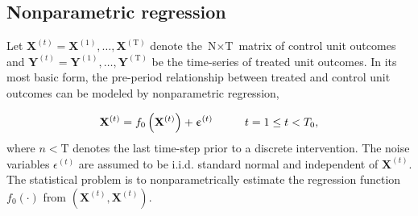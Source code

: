 \documentclass[hidelinks,12pt]{article}
\begin{document}





\subsection{Nonparametric regression}

Let $\mathbf{X}^{(t)}= \mathbf{X}^{(1)}, \ldots, \mathbf{X}^{(\text{T})}$ denote the $\text{N} \times \text{T}$ matrix of control unit outcomes and  $\mathbf{Y}^{(t)}= \mathbf{Y}^{(1)}, \ldots, \mathbf{Y}^{(\text{T})}$ be the time-series of treated unit outcomes. In its most basic form, the pre-period relationship between treated and control unit outcomes can be modeled by nonparametric regression, 

\begin{equation}\label{eq:pre}
  \mathbf{X}^{(t)} =  f_0 \left(\mathbf{X}^{(t)}\right) + \upepsilon^{(t)} \hspace{10mm} t = 1 \leq t < T_0, 
\end{equation}
\noindent
where $n < \text{T}$ denotes the last time-step prior to a discrete intervention. The noise variables $\epsilon^{(t)}$ are assumed to be i.i.d. standard normal and independent of $\mathbf{X}^{(t)}$. The statistical problem is to nonparametrically estimate the regression function $f_0(\cdot)$ from $\left(\mathbf{X}^{(t)}, \mathbf{X}^{(t)}\right)$. 
\end{document}
